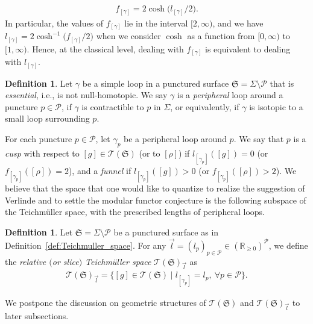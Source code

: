 \documentclass[pdftex]{sigma}
\numberwithin{equation}{section}
\theoremstyle{definition}
\newtheorem{Definition}[Theorem]{Definition}
\begin{document}
\begin{align}
\label{eq:trace_of_monodromy_as_length}
f_{[\gamma]} = 2\cosh\bigl(l_{[\gamma]}/2\bigr).
\end{align}
In particular, the values of $f_{[\gamma]}$ lie in the interval $[2,\infty)$, and we have $l_{[\gamma]} = 2 \cosh^{-1} \bigl( f_{[\gamma]}/2\bigr)$ when we consider $\cosh$ as a function from $[0,\infty)$ to $[1,\infty)$. Hence, at the classical level, dealing with $f_{[\gamma]}$ is equivalent to dealing with $l_{[\gamma]}$.
\begin{Definition}\label{def:essential_and_peripheral}
Let $\gamma$ be a simple loop in a punctured surface $\mathfrak{S} = \Sigma\setminus\mathcal{P}$ that is {\em essential}, i.e., is not null-homotopic. We say $\gamma$ is a {\em peripheral} loop around a puncture $p \in \mathcal{P}$, if $\gamma$ is contractible to $p$ in $\Sigma$, or equivalently, if $\gamma$ is isotopic to a small loop surrounding $p$.
\end{Definition}
For each puncture $p \in \mathcal{P}$, let $\gamma_p$ be a peripheral loop around $p$. We say that $p$ is a {\em cusp} with respect to $[g] \in \mathscr{T}(\mathfrak{S})$ (or to $[\rho]$) if $l_{[\gamma_p]}([g])=0$ (or $f_{[\gamma_p]}([\rho])=2$), and a {\em funnel} if $l_{[\gamma_p]}([g])>0$ (or $f_{[\gamma_p]}([\rho])>2$).
We believe that the space that one would like to quantize to realize the suggestion of Verlinde \cite{Verlinde} and to settle the modular functor conjecture \cite{F97,FG09} is the following subspace of the Teichm\"uller space, with the prescribed lengths of peripheral loops.
\begin{Definition}
\label{def:relative_Teichmuller_space}
Let $\mathfrak{S} = \Sigma\setminus \mathcal{P}$ be a punctured surface as in Definition~\ref{def:Teichmuller_space}. For any $\vec{l} = (l_p)_{p \in \mathcal{P}} \in (\mathbb{R}_{\ge 0})^\mathcal{P}$, we define the {\em relative $($or slice$)$ Teichm\"uller space} $\mathscr{T}(\mathfrak{S})_{\vec{l}}$ as
\begin{align*}
\mathscr{T}(\mathfrak{S})_{\vec{l}} = \bigl\{[g] \in \mathscr{T}(\mathfrak{S}) \mid l_{[\gamma_p]} = l_p, ~ \forall p \in \mathcal{P} \bigr\}.
\end{align*}
\end{Definition}
We postpone the discussion on geometric structures of $\mathscr{T}(\mathfrak{S})$ and $\mathscr{T}(\mathfrak{S})_{\vec{l}}$ to later subsections.
\end{document}
